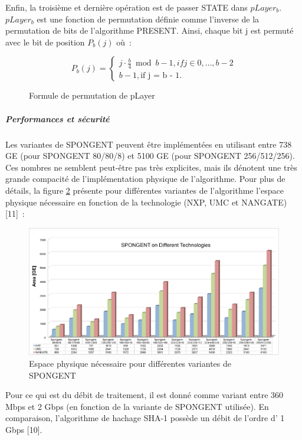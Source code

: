 		Enfin, la troisième et dernière opération est de passer STATE dans $pLayer_{b}$.
		$pLayer_{b}$ est une fonction de permutation définie comme l’inverse de la permutation de bits de l’algorithme PRESENT.
		Ainsi, chaque bit j est permuté avec le bit de position $P_{b}(j)$ où :

		\begin{figure}[htbp]
			\centering
		\begin{equation}
			P_{b}(j) = \begin{cases}
			  j \cdot \frac{b}{4} \bmod b - 1, if j \in {0, \dots, b - 2}\\
			  b - 1, \text{if j = b - 1}.
			\end{cases}
		  \end{equation}
		  \caption{Formule de permutation de pLayer}
			\label{pLayer}
		\end{figure}

		\subparagraph{Performances et sécurité}

		Les variantes de SPONGENT peuvent être implémentées en utilisant entre 738 GE (pour SPONGENT 80/80/8) et 5100 GE (pour SPONGENT 256/512/256).
		Ces nombres ne semblent peut-être pas très explicites, mais ils dénotent une très grande compacité de l’implémentation physique de l’algorithme.
		Pour plus de détails, la figure \ref{espacePhysique} présente pour différentes variantes de l’algorithme l’espace physique nécessaire en fonction de la technologie (NXP, UMC et NANGATE)[11] :

		\begin{figure}[h]
			\centering
			\includegraphics[width=\textwidth]{imgs/Spongent/espacePhysiqueVariante.png}
			\caption{Espace physique nécessaire pour différentes variantes de SPONGENT}
			\label{espacePhysique}
		\end{figure}

		Pour ce qui est du débit de traitement, il est donné comme variant entre 360 Mbps et 2 Gbps (en fonction de la variante de SPONGENT utilisée).
		En comparaison, l’algorithme de hachage SHA-1 possède un débit de l’ordre d’ 1 Gbps [10].


